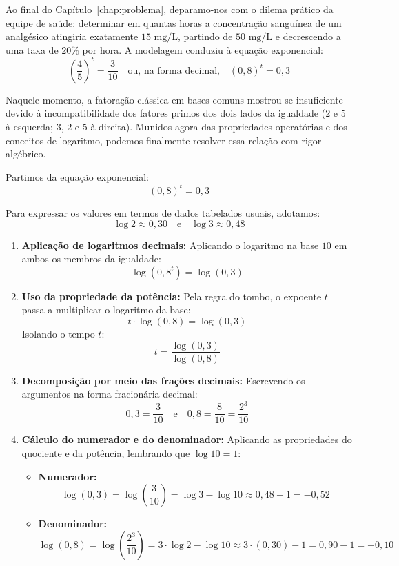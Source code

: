 \documentclass[12pt,a4paper]{report}
\begin{document}
	Ao final do Capítulo~\ref{chap:problema}, deparamo-nos com o dilema prático da equipe de saúde: determinar em quantas horas a concentração sanguínea de um analgésico atingiria exatamente $15\text{ mg/L}$, partindo de $50\text{ mg/L}$ e decrescendo a uma taxa de $20\%$ por hora. A modelagem conduziu à equação exponencial:
	$$\left(\frac{4}{5}\right)^t = \frac{3}{10} \quad \text{ou, na forma decimal,} \quad (0{,}8)^t = 0{,}3$$
	
	Naquele momento, a fatoração clássica em bases comuns mostrou-se insuficiente devido à incompatibilidade dos fatores primos dos dois lados da igualdade ($2$ e $5$ à esquerda; $3$, $2$ e $5$ à direita). Munidos agora das propriedades operatórias e dos conceitos de logaritmo, podemos finalmente resolver essa relação com rigor algébrico.
	
	\begin{destaque}
		Partimos da equação exponencial:
		$$(0{,}8)^t = 0{,}3$$
		
		Para expressar os valores em termos de dados tabelados usuais, adotamos:
		$$\log 2 \approx 0{,}30 \quad \text{e} \quad \log 3 \approx 0{,}48$$
		
		\begin{enumerate}[label=\textbf{\arabic*.}]
			\item \textbf{Aplicação de logaritmos decimais:}  
			Aplicando o logaritmo na base $10$ em ambos os membros da igualdade:
			$$\log(0{,}8^t) = \log(0{,}3)$$
			\newpage
			\item \textbf{Uso da propriedade da potência:}  
			Pela regra do tombo, o expoente $t$ passa a multiplicar o logaritmo da base:
			$$t \cdot \log(0{,}8) = \log(0{,}3)$$
			Isolando o tempo $t$:
			$$t = \frac{\log(0{,}3)}{\log(0{,}8)}$$
			
			\item \textbf{Decomposição por meio das frações decimais:}  
			Escrevendo os argumentos na forma fracionária decimal:
			$$0{,}3 = \frac{3}{10} \quad \text{e} \quad 0{,}8 = \frac{8}{10} = \frac{2^3}{10}$$
			
			\item \textbf{Cálculo do numerador e do denominador:}  
			Aplicando as propriedades do quociente e da potência, lembrando que $\log 10 = 1$:
			\begin{itemize}[label=$\circ$]
				\item \textbf{Numerador:}  
				$$\log(0{,}3) = \log\left(\frac{3}{10}\right) = \log 3 - \log 10 \approx 0{,}48 - 1 = -0{,}52$$
				\item \textbf{Denominador:}  
				$$\log(0{,}8) = \log\left(\frac{2^3}{10}\right) = 3 \cdot \log 2 - \log 10 \approx 3 \cdot (0{,}30) - 1 = 0{,}90 - 1 = -0{,}10$$
			\end{itemize}
			

\end{enumerate}
\end{destaque}
\end{document}

